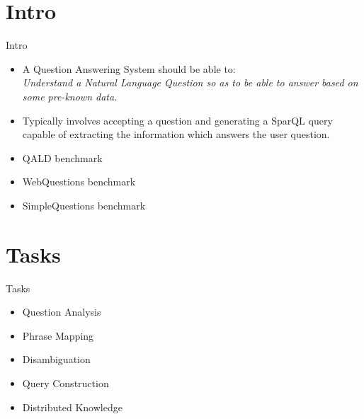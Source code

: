 \documentclass{beamer}
\begin{document}
\section{Intro}

\begin{frame}{Intro}
  \begin{cardTiny}
    \begin{itemize}
      \item A Question Answering System should be able to: \\
      \textit{Understand a Natural Language Question so as to be able to answer based on some pre-known data.}
    \end{itemize}
  \end{cardTiny}
  \begin{cardTiny}
    \begin{itemize}
      \item Typically involves accepting a question and generating a SparQL query capable of extracting the information which answers the user question.
    \end{itemize}
  \end{cardTiny}
  \begin{cardTiny}
    \begin{itemize}
      \item QALD benchmark
      \item WebQuestions benchmark
      \item SimpleQuestions benchmark
    \end{itemize}
  \end{cardTiny}
\end{frame}

\section{Tasks}

\begin{frame}{Tasks}
  \begin{card}
    \begin{itemize}
      \item Question Analysis
      \item Phrase Mapping
      \item Disambiguation
      \item Query Construction
      \item Distributed Knowledge
    \end{itemize}
  \end{card}
\end{frame}
\end{document}
